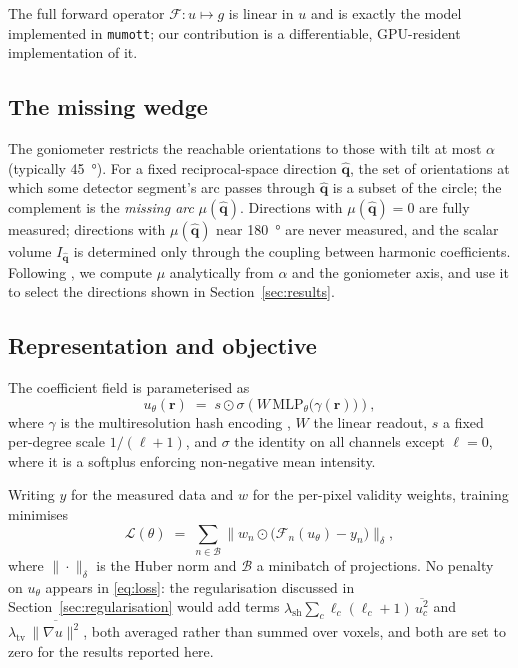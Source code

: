 \documentclass[11pt,a4paper]{article}
\newcommand{\qvec}{\hat{\boldsymbol{q}}}
\newcommand{\rvec}{\boldsymbol{r}}
\begin{document}
The full forward operator $\mathcal{F}: u \mapsto g$ is linear in $u$ and is exactly the
model implemented in \texttt{mumott}; our contribution is a differentiable, GPU-resident
implementation of it.

\subsection{The missing wedge}

The goniometer restricts the reachable orientations to those with tilt at most $\alpha$
(typically \SI{45}{\degree}). For a fixed reciprocal-space direction $\qvec$, the set of
orientations at which some detector segment's arc passes through $\qvec$ is a subset of the
circle; the complement is the \emph{missing arc} $\mu(\qvec)$. Directions with
$\mu(\qvec)=0$ are fully measured; directions with $\mu(\qvec)$ near \SI{180}{\degree} are
never measured, and the scalar volume $I_{\qvec}$ is determined only through the coupling
between harmonic coefficients. Following \citet{Nielsen2024}, we compute $\mu$ analytically
from $\alpha$ and the goniometer axis, and use it to select the directions shown in
Section~\ref{sec:results}.

\subsection{Representation and objective}

The coefficient field is parameterised as
\begin{equation}
u_\theta(\rvec) \;=\; s \odot \sigma\!\left( W\, \mathrm{MLP}_\theta\big(\gamma(\rvec)\big) \right),
\end{equation}
where $\gamma$ is the multiresolution hash encoding \citep{Mueller2022}, $W$ the linear
readout, $s$ a fixed per-degree scale $1/(\ell+1)$, and $\sigma$ the identity on all
channels except $\ell=0$, where it is a softplus enforcing non-negative mean intensity.

Writing $y$ for the measured data and $w$ for the per-pixel validity weights, training
minimises
\begin{equation}
\mathcal{L}(\theta) \;=\;
\sum_{n \in \mathcal{B}} \big\| w_n \odot \big( \mathcal{F}_n(u_\theta) - y_n \big) \big\|_{\delta},
\label{eq:loss}
\end{equation}
where $\|\cdot\|_\delta$ is the Huber norm and $\mathcal{B}$ a minibatch of projections.
No penalty on $u_\theta$ appears in \eqref{eq:loss}: the regularisation discussed in
Section~\ref{sec:regularisation} would add terms
$\lambda_{\mathrm{sh}}\sum_c \ell_c(\ell_c+1)\,\overline{u_c^2}$ and
$\lambda_{\mathrm{tv}}\,\overline{\|\nabla u\|^2}$, both averaged rather than summed over
voxels, and both are set to zero for the results reported here.
\end{document}
